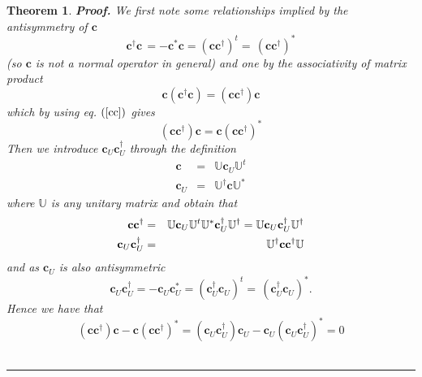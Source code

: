 \documentclass[aps,preprint]{revtex4}
\newtheorem{theorem}{Theorem}
\newenvironment{proof}[1][Proof]{\noindent\textbf{#1.} }{\ \rule{0.5em}{0.5em}}
\begin{document}
\begin{theorem}
\begin{proof}
We first note some relationships implied by the antisymmetry of $\mathbf{c}$%
\begin{equation}
\mathbf{c}^{\dagger }\mathbf{c\,=-c}^{\ast }\mathbf{c}=\left( \mathbf{cc}%
^{\dagger }\right) ^{t}=\mathbf{\,}\left( \mathbf{cc}^{\dagger }\right)
^{\ast }  \label{cc}
\end{equation}%
(so $\mathbf{c}$ is not a normal operator in general) and one by the
associativity of matrix product 
\begin{equation}
\mathbf{c}\left( \mathbf{c}^{\dagger }\mathbf{c}\right) =\left( \mathbf{cc}%
^{\dagger }\right) \mathbf{c}
\end{equation}%
which by using eq. $\left( \ref{cc}\right) $ gives 
\begin{equation}
\left( \mathbf{cc}^{\dagger }\right) \mathbf{c=c}\left( \mathbf{cc}^{\dagger
}\right) ^{\ast }  \label{cr}
\end{equation}%
Then we introduce $\mathbf{c}_{U}\mathbf{c}_{U}^{\dagger }$ through the
definition 
\begin{eqnarray}
\mathbf{c} &=&\mathbb{U}\mathbf{c}_{U}\mathbb{U}^{t} \\
\mathbf{c}_{U} &=&\mathbb{U}^{\dagger }\mathbf{c}\mathbb{U}^{\ast }
\end{eqnarray}%
where $\mathbb{U}$ is any unitary matrix and obtain that 
\begin{eqnarray}
\mathbf{cc}^{\dagger } &=&\mathbb{U}\mathbf{c}_{U}\mathbb{U}^{t}\mathbb{U}%
^{\ast }\mathbf{c}_{U}^{\dagger }\mathbb{U}^{\dagger }=\mathbb{U}\mathbf{c}%
_{U}\mathbf{c}_{U}^{\dagger }\mathbb{U}^{\dagger }  \notag \\
\mathbf{c}_{U}\mathbf{c}_{U}^{\dagger } &=&\mathbb{U}^{\dagger }\mathbf{cc}%
^{\dagger }\mathbb{U}
\end{eqnarray}%
and as $\mathbf{c}_{U}$ is also antisymmetric 
\begin{equation}
\mathbf{c}_{U}\mathbf{c}_{U}^{\dagger }=-\mathbf{c}_{U}\mathbf{c}_{U}^{\ast
}=\left( \mathbf{c}_{U}^{\dagger }\mathbf{c}_{U}\right) ^{t}=\mathbf{\,}%
\left( \mathbf{c}_{U}^{\dagger }\mathbf{c}_{U}\right) ^{\ast }.
\end{equation}%
Hence we have that 
\begin{equation}
\left( \mathbf{cc}^{\dagger }\right) \mathbf{c-c}\left( \mathbf{cc}^{\dagger
}\right) ^{\ast }=\left( \mathbf{c}_{U}\mathbf{c}_{U}^{\dagger }\right) 
\mathbf{c}_{U}-\mathbf{c}_{U}\left( \mathbf{c}_{U}\mathbf{c}_{U}^{\dagger
}\right) ^{\ast }=0  \label{cu}

\end{equation}
\end{proof}
\end{theorem}
\end{document}
